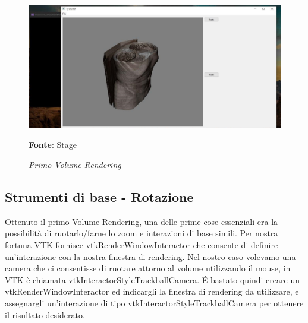 \begin{figure}[h]
    \centering
    \includegraphics[width=1\textwidth]{immagini/svolgimento/firstvolume.jpg}
    \caption{\textit{Primo Volume Rendering}}
    \textbf{Fonte}: Stage
    \label{fig: firstvolume}
\end{figure}

\subsection{Strumenti di base - Rotazione}
Ottenuto il primo Volume Rendering, una delle prime cose essenziali era la possibilità di ruotarlo/farne lo zoom e interazioni di base simili. Per nostra fortuna VTK fornisce vtkRenderWindowInteractor che consente di definire un'interazione con la nostra finestra di rendering. Nel nostro caso volevamo una camera che ci consentisse di ruotare attorno al volume utilizzando il mouse, in VTK è chiamata vtkInteractorStyleTrackballCamera. \'E bastato quindi creare un vtkRenderWindowInteractor ed indicargli la finestra di rendering da utilizzare, e assegnargli un'interazione di tipo vtkInteractorStyleTrackballCamera per ottenere il risultato desiderato.

